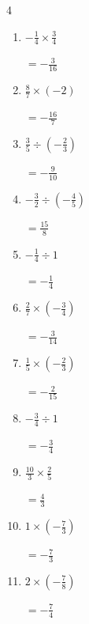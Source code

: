 \begin{multicols}{4}
\begin{enumerate}
        $\displaystyle =-\frac{1}{2}$

  \item $\displaystyle -\frac{1}{4}\times{}\frac{3}{4}$

        $\displaystyle =-\frac{3}{16}$

  \item $\displaystyle \frac{8}{7}\times{}\left(-2\right)$

        $\displaystyle =-\frac{16}{7}$

  \item $\displaystyle \frac{3}{5}\div{}\left(-\frac{2}{3}\right)$

        $\displaystyle =-\frac{9}{10}$

  \item $\displaystyle -\frac{3}{2}\div{}\left(-\frac{4}{5}\right)$

        $\displaystyle =\frac{15}{8}$

  \item $\displaystyle -\frac{1}{4}\div{}1$

        $\displaystyle =-\frac{1}{4}$

  \item $\displaystyle \frac{2}{7}\times{}\left(-\frac{3}{4}\right)$

        $\displaystyle =-\frac{3}{14}$

\columnbreak %

\resetques

  \item $\displaystyle \frac{1}{5}\times{}\left(-\frac{2}{3}\right)$

        $\displaystyle =-\frac{2}{15}$

  \item $\displaystyle -\frac{3}{4}\div{}1$

        $\displaystyle =-\frac{3}{4}$

  \item $\displaystyle \frac{10}{3}\times{}\frac{2}{5}$

        $\displaystyle =\frac{4}{3}$

  \item $\displaystyle 1\times{}\left(-\frac{7}{3}\right)$

        $\displaystyle =-\frac{7}{3}$

  \item $\displaystyle 2\times{}\left(-\frac{7}{8}\right)$

        $\displaystyle =-\frac{7}{4}$


\end{enumerate}
\end{multicols}
